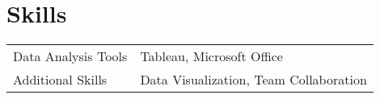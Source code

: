 \documentclass[a4paper,12pt]{article}
\begin{document}
\section{Skills}
\begin{tabularx}{\linewidth}{@{}l X@{}}
Data Analysis Tools &  \normalsize{Tableau, Microsoft Office} \\
Additional Skills  &  \normalsize{Data Visualization, Team Collaboration} \\  
\end{tabularx}

\vfill
{}
\end{document}
